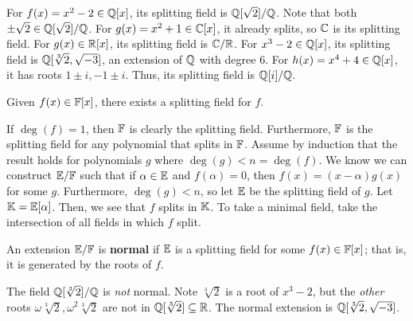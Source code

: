 \begin{xmp}[source=Primary Source Material]
    For $ f(x)=x^{2}-2 \in \mathbb{Q}[x] $, its splitting field is
    $ \mathbb{Q}[\sqrt{2}]/\mathbb{Q} $.
    Note that both $ \pm\sqrt{2} \in \mathbb{Q}[\sqrt{2}]/\mathbb{Q} $. \vsp
    For $ g(x) = x^{2}+1 \in \mathbb{C}[x] $, it already splits, so $ \mathbb{C} $ is its
    splitting field.
    For $ g(x) \in \mathbb{R}[x] $, its splitting field is $ \mathbb{C}/\mathbb{R} $. \vsp
    For $ x^{3}-2 \in \mathbb{Q}[x] $, its splitting field is
    $ \mathbb{Q}[\sqrt[3]{2}, \sqrt{-3}] $, an extension of $ \mathbb{Q} $ with degree 6. \vsp
    For $ h(x)=x^{4}+4 \in \mathbb{Q}[x] $, it has roots $ 1 \pm i,-1\pm i $.
    Thus, its splitting field is $ \mathbb{Q}[i]/\mathbb{Q} $.
\end{xmp}

\begin{thm}
    Given $ f(x) \in \mathbb{F}[x] $, there exists a splitting field for $ f $.
\end{thm}

\begin{pf}[source=Primary Source Material]
    If $ \deg(f) = 1 $, then $ \mathbb{F} $ is clearly the splitting field.
    Furthermore, $ \mathbb{F} $ is the splitting field for any polynomial that splits
    in $ \mathbb{F} $. \vsp
    Assume by induction that the result holds for polynomials $ g $ where
    $ \deg(g) < n = \deg(f) $. We know we can construct $ \mathbb{E}/\mathbb{F} $ such that
    if $ \alpha \in \mathbb{E} $ and $ f(\alpha) = 0 $, then $ f(x)=(x-\alpha)g(x) $
    for some $ g $. Furthermore, $ \deg(g) < n $, so let $ \mathbb{E} $ be the splitting
    field of $ g $. \vsp
    Let $ \mathbb{K} = \mathbb{E}[\alpha] $. Then, we see that $ f $ splits in $ \mathbb{K} $.
    To take a minimal field, take the intersection of all fields in which $ f $
    split.
\end{pf}

\begin{defn}
    An extension $ \mathbb{E}/\mathbb{F} $ is \textbf{normal} if $ \mathbb{E} $ is a splitting field
    for some $ f(x) \in \mathbb{F}[x] $; that is, it is generated by the roots of $ f $.
\end{defn}

\begin{xmp}[source=Primary Source Material]
    The field $ \mathbb{Q}[\sqrt[3]{2}]/\mathbb{Q} $ is \textit{not} normal. \vsp
    Note $ \sqrt[3]{2} $ is a root of $ x^{3}-2 $, but the \textit{other} roots
    $ \omega\sqrt[3]{2}, \omega^{2}\sqrt[3]{2} $ are not in $ \mathbb{Q}[\sqrt[3]{2}]
    \subseteq \mathbb{R} $. \vsp
    The normal extension is $ \mathbb{Q}[\sqrt[3]{2}, \sqrt{-3}] $.
\end{xmp}

